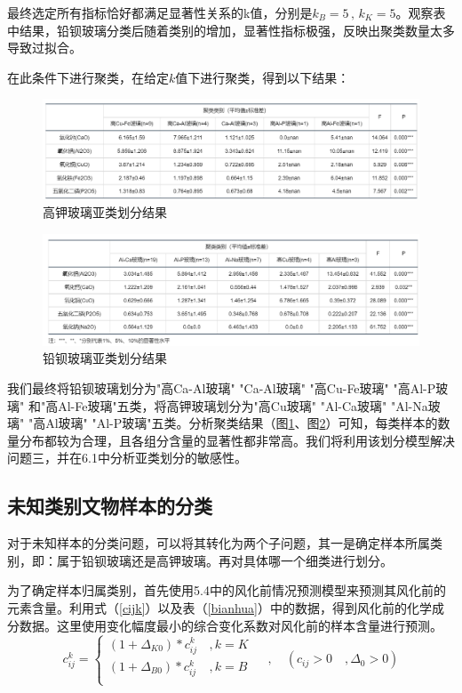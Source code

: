 \documentclass{my_paper}
\begin{document}
最终选定所有指标恰好都满足显著性关系的k值，分别是$k_B = 5\,,\,k_K = 5$。观察表中结果，铅钡玻璃分类后随着类别的增加，显著性指标极强，反映出聚类数量太多导致过拟合。

在此条件下进行聚类，在给定$k$值下进行聚类，得到以下结果：
\begin {figure}[h]
\centering %
\includegraphics[width=\textwidth]{kkres.png}
\caption{高钾玻璃亚类划分结果} %
\label{kkres}
\end {figure}
\begin {figure}[h]
\centering %
\includegraphics[width=\textwidth]{kbres.png}
\caption{铅钡玻璃亚类划分结果} %
\label{kbres}
\end {figure}

\newpage
我们最终将铅钡玻璃划分为"高Ca-Al玻璃"
"Ca-Al玻璃"
"高Cu-Fe玻璃"
"高Al-P玻璃"
和"高Al-Fe玻璃"五类，将高钾玻璃划分为"高Cu玻璃"
"Al-Ca玻璃"
"Al-Na玻璃"
"高Al玻璃"
"Al-P玻璃"五类。分析聚类结果（图\ref{kkres}、图\ref{kbres}）可知，每类样本的数量分布都较为合理，且各组分含量的显著性都非常高。我们将利用该划分模型解决问题三，并在6.1中分析亚类划分的敏感性。

\subsection{未知类别文物样本的分类}

对于未知样本的分类问题，可以将其转化为两个子问题，其一是确定样本所属类别，即：属于铅钡玻璃还是高钾玻璃。再对具体哪一个细类进行划分。

为了确定样本归属类别，首先使用5.4中的风化前情况预测模型来预测其风化前的元素含量。利用式（\ref{cijk}）以及表（\ref{bianhua}）中的数据，得到风化前的化学成分数据。这里使用变化幅度最小的综合变化系数对风化前的样本含量进行预测。
$$    c_{ij}^k = \begin{cases}
  (1+\Delta_{K0})*c_{ij}^k&\,,k=K\\
  (1+\Delta_{B0})*c_{ij}^k&\,,k=B\\
\end{cases} \, \quad , \quad (c_{ij}>0\quad ,\Delta_0 > 0)$$
\end{document}
